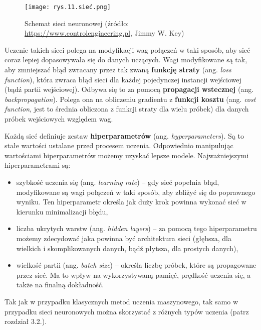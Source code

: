 \begin{figure}[h]
    \centering
    \texttt{[image: rys.11.sieć.png]}
    \caption{Schemat sieci neuronowej (źródło: \protect\url{https://www.controlengineering.pl}, Jimmy W. Key)}
    \label{fig:mesh11}
\end{figure}
Uczenie takich sieci polega na modyfikacji wag połączeń w taki sposób, aby sieć coraz lepiej dopasowywała się do danych uczących. Wagi modyfikowane są tak, aby zmniejszać błąd zwracany przez tak zwaną \textbf{funkcję straty} (ang. \textit{loss function}), która zwraca błąd sieci dla każdej pojedynczej instancji wejściowej (bądź partii wejściowej). Odbywa się to za pomocą \textbf{propagacji wstecznej} (ang. \textit{backpropagation}). Polega ona na obliczeniu gradientu z \textbf{funkcji kosztu} (ang. \textit{cost function}, jest to średnia obliczona z funkcji straty dla wielu próbek) dla danych próbek wejściowych względem wag. 

Każdą sieć definiuje zestaw \textbf{hiperparametrów} (ang. \textit{hyperparameters}). Są to stałe wartości ustalane przed procesem uczenia. Odpowiednio manipulując wartościami hiperparametrów możemy uzyskać lepsze modele. Najważniejszymi hiperparametrami są:
\begin{itemize}
\item
szybkość uczenia się (ang. \textit{learning rate}) – gdy sieć popełnia błąd, modyfikowane są wagi połączeń w taki sposób, aby zbliżyć się do poprawnego wyniku. Ten hiperparametr określa jak duży krok powinna wykonać sieć w kierunku minimalizacji błędu,

\item
liczba ukrytych warstw (ang. \textit{hidden layers}) – za pomocą tego hiperparametru możemy zdecydować jaka powinna być architektura sieci (głębsza, dla wielkich i skomplikowanych danych, bądź płytsza, dla prostych danych),

\item
wielkość partii (ang. \textit{batch size}) – określa liczbę próbek, które są propagowane przez sieć. Ma to wpływ na wykorzystywaną pamięć, prędkość uczenia się, a także na finalną dokładność. 
\end{itemize}
\noindent Tak jak w przypadku klasycznych metod uczenia maszynowego, tak samo w przypadku sieci neuronowych można skorzystać z różnych typów uczenia (patrz rozdział 3.2.). 


